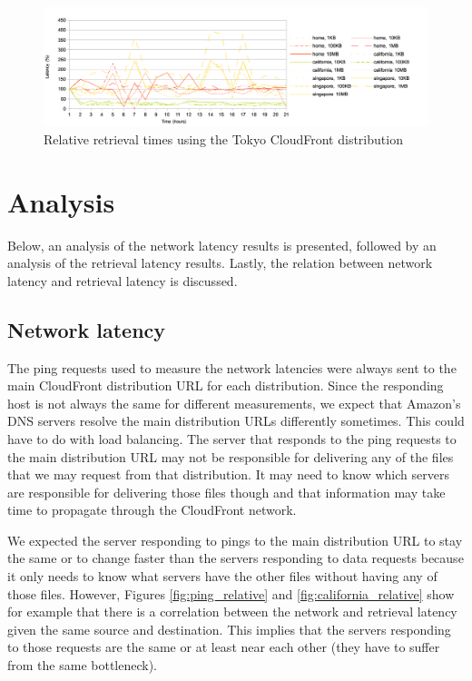 \documentclass[conference]{IEEEtran}
\begin{document}
\begin{figure}[]
    \centering
    \includegraphics[width=6in]{images/tokyo_relative.png}
    \caption[]{Relative retrieval times using the Tokyo CloudFront distribution}
    \label{fig:tokyo_relative}
\end{figure}


\section{Analysis}
Below, an analysis of the network latency results is presented, followed by an analysis of the retrieval latency results. Lastly, the relation between network latency and retrieval latency is discussed.

\subsection{Network latency}
The ping requests used to measure the network latencies were always sent to the main CloudFront distribution URL for each distribution. Since the responding host is not always the same for different measurements, we expect that Amazon's DNS servers resolve the main distribution URLs differently sometimes. This could have to do with load balancing. The server that responds to the ping requests to the main distribution URL may not be responsible for delivering any of the files that we may request from that distribution. It may need to know which servers are responsible for delivering those files though and that information may take time to propagate through the CloudFront network.

We expected the server responding to pings to the main distribution URL to stay the same or to change faster than the servers responding to data requests because it only needs to know what servers have the other files without having any of those files. However, Figures \ref{fig:ping_relative} and \ref{fig:california_relative} show for example that there is a correlation between the network and retrieval latency given the same source and destination. This implies that the servers responding to those requests are the same or at least near each other (they have to suffer from the same bottleneck).
\end{document}
